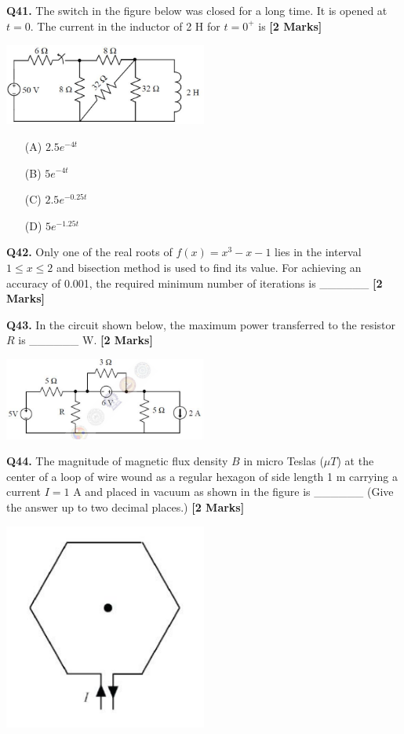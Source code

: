 \documentclass[11pt]{article}
\newcommand{\questionb}[2]{
    \noindent\textbf{Q#2.} #1 \hfill \textbf{[2 Marks]}
}
\begin{document}
\questionb{The switch in the figure below was closed for a long time. It is opened at \( t = 0 \). The current in the inductor of 2 H for \( t = 0^+ \) is}{41}
\begin{center}
\includegraphics[width=0.5\textwidth]{figures/41.png}
\end{center}
\begin{enumerate}
    \item[(A)] \( 2.5e^{-4t} \)  
    \item[(B)] \( 5e^{-4t} \)  
    \item[(C)] \( 2.5e^{-0.25t} \)  
    \item[(D)] \( 5e^{-1.25t} \)  
\end{enumerate}
\vspace{0.5cm}

\questionb{Only one of the real roots of \( f(x) = x^3 - x - 1 \) lies in the interval \( 1 \leq x \leq 2 \) and bisection method is used to find its value. For achieving an accuracy of 0.001, the required minimum number of iterations is \_\_\_\_\_\_}{42}
\vspace{0.5cm}

\questionb{In the circuit shown below, the maximum power transferred to the resistor \( R \) is \_\_\_\_\_\_ W.}{43}
\begin{center}
\includegraphics[width=0.5\textwidth]{figures/43.png}
\end{center}
\vspace{0.5cm}

\questionb{The magnitude of magnetic flux density \( B \) in micro Teslas (\( \mu T \)) at the center of a loop of wire wound as a regular hexagon of side length 1 m carrying a current \( I = 1 \) A and placed in vacuum as shown in the figure is \_\_\_\_\_\_ (Give the answer up to two decimal places.)}{44}
\begin{center}
\includegraphics[width=0.5\textwidth]{figures/44.png}
\end{center}
\vspace{0.5cm}
\end{document}
